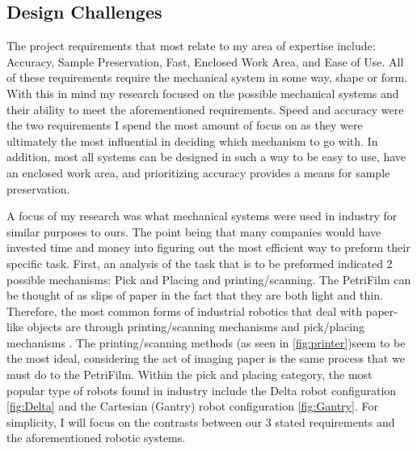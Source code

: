 \documentclass[11pt]{article}
\begin{document}
\subsection{Design Challenges}

The project requirements that most relate to my area of expertise include: Accuracy, Sample Preservation, Fast, Enclosed Work Area, and Ease of Use. All of these requirements require the mechanical system in some way, shape or form. With this in mind my research focused on the possible mechanical systems and their ability to meet the aforementioned requirements. Speed and accuracy were the two requirements I spend the most amount of focus on as they were ultimately the most influential in deciding which mechanism to go with. In addition, most all systems can be designed in such a way to be easy to use, have an enclosed work area, and prioritizing accuracy provides a means for sample preservation. 

A focus of my research was what mechanical systems were used in industry for similar purposes to ours. The point being that many companies would have invested time and money into figuring out the most efficient way to preform their specific task. First, an analysis of the task that is to be preformed indicated 2 possible mechanisms: Pick and Placing and printing/scanning. The PetriFilm can be thought of as slips of paper in the fact that they are both light and thin. Therefore, the most common forms of industrial robotics that deal with paper-like objects are through printing/scanning mechanisms and pick/placing mechanisms \cite{robot_types}. The printing/scanning methods (as seen in \ref{fig:printer})seem to be the most ideal, considering the act of imaging paper is the same process that we must do to the PetriFilm. Within the pick and placing category, the most popular type of robots found in industry include the Delta robot configuration \ref{fig:Delta} and the Cartesian (Gantry) robot configuration \ref{fig:Gantry}. For simplicity, I will focus on the contrasts between our 3 stated requirements and the aforementioned robotic systems. 
\end{document}
